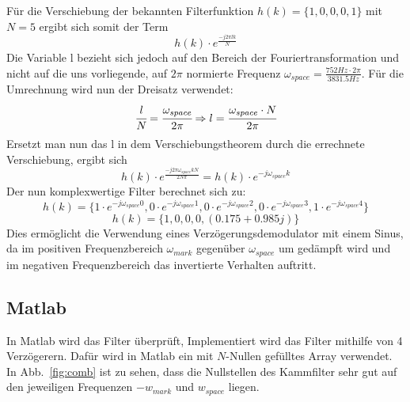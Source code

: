 \documentclass{article}
\begin{document}
Für die Verschiebung der bekannten Filterfunktion $h(k) = \{1,0,0,0,1\}$ mit $N=5$ ergibt sich somit der Term
$$
h(k) \cdot e^{\frac{-j2\pi{lk}}{N}}
$$
Die Variable l bezieht sich jedoch auf den Bereich der Fouriertransformation und nicht auf die uns vorliegende, auf $2\pi$ normierte Frequenz $\omega_{space} = \frac{752Hz\cdot{2\pi}}{3831.5Hz}$. Für die Umrechnung wird nun der Dreisatz verwendet:
$$
\cfrac{l}{N} = \cfrac{\omega_{space}}{2\pi} \Rightarrow l=\cfrac{\omega_{space} \cdot N}{2\pi}
$$
Ersetzt man nun das l in dem Verschiebungstheorem durch die errechnete Verschiebung, ergibt sich
$$
h(k) \cdot e^{\frac{-j2\pi\omega_{space}kN}{2N\pi}} = h(k) \cdot e^{-j\omega_{space}k}
$$
Der nun komplexwertige Filter berechnet sich zu:
$$
h(k) = \{ 1 \cdot e^{-j\omega_{space}0} , 0 \cdot e^{-j\omega_{space}1} , 0 \cdot e^{-j\omega_{space}2} , 0 \cdot e^{-j\omega_{space}3} , 1 \cdot e^{-j\omega_{space}4}\}
$$
$$
h(k) = \{ 1, 0, 0, 0, (0.175 + 0.985j) \}
$$
Dies ermöglicht die Verwendung eines Verzögerungsdemodulator mit einem Sinus, da im positiven Frequenzbereich $\omega_{mark}$ gegenüber $\omega_{space}$ um gedämpft wird und im negativen Frequenzbereich das invertierte Verhalten auftritt.

\subsection{Matlab}
In Matlab wird das Filter überprüft, Implementiert wird das Filter mithilfe von 4 Verzögerern.
Dafür wird in Matlab ein mit $N$-Nullen gefülltes Array verwendet. In Abb.~\ref{fig:comb} ist zu sehen,
dass die Nullstellen des Kammfilter sehr gut auf den jeweiligen Frequenzen $- w_{mark}$ und $w_{space}$ liegen.

%    
%    
\end{document}
